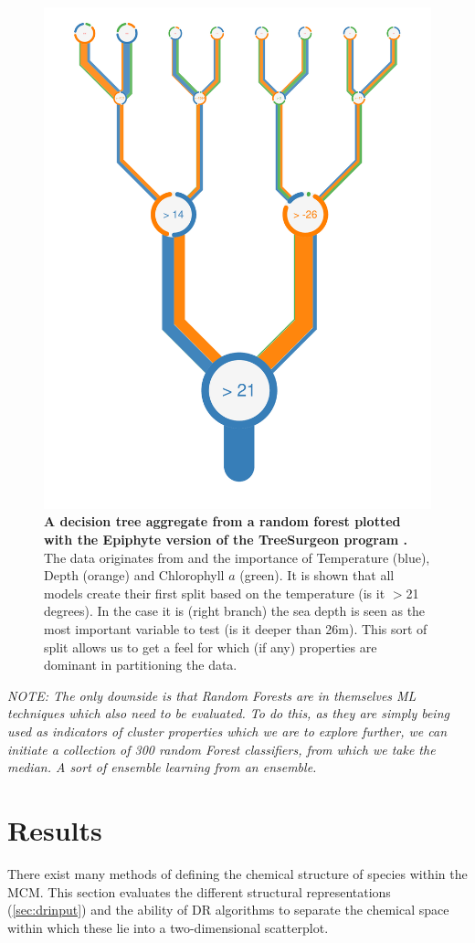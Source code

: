 \begin{figure}[H]
     \centering
         \includegraphics[width=.55\textwidth]{4fig/Oi_prj_features_of_RFR(TEMP+DEPTH+ChlrA)_for_depth_5_white.pdf}
        \caption{\textbf{A decision tree aggregate from a random forest plotted with the Epiphyte version of the TreeSurgeon program \citep{forrester}.} The data originates from \cite{iodene} and the importance of Temperature (blue), Depth (orange) and Chlorophyll $a$ (green). It is shown that all models create their first split based on the temperature (is it $>$21 degrees). In the case it is (right branch) the sea depth is seen as the most important variable to test (is it deeper than 26m). This sort of split allows us to get a feel for which (if any) properties are dominant in partitioning the data. }
        \label{fig:iodenetree}
\end{figure}


%

\textit{NOTE: The only downside is that Random Forests are in themselves ML techniques which also need to be evaluated. To do this, as they are simply being used as indicators of cluster properties which we are to explore further, we can initiate a collection of 300 random Forest classifiers, from which we take the median. A sort of ensemble learning from an ensemble. }


\section{Results}\label{sec:drres}
%
There exist many methods of defining the chemical structure of species within the MCM. This section evaluates the different structural representations (\autoref{sec:drinput}) and the ability of DR algorithms to separate the chemical space within which these lie into a two-dimensional scatterplot.

